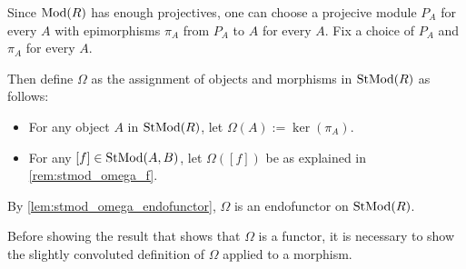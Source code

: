 \begin{definition}
    \label{def:stmod_omega}
    Since \( \operatorname{Mod}(R) \) has enough projectives, one can choose a projecive module \( P_A \) for every \( A \) with epimorphisms \( \pi_A \) from \( P_A \) to \( A \) for every \( A \). Fix a choice of \( P_A \) and \( \pi_A \) for every \( A \).

    Then define \( \Omega \) as the assignment of objects and morphisms in \( \operatorname{StMod}(R) \) as follows:
    \begin{itemize}
        \item For any object \( A \) in \( \operatorname{StMod}(R) \), let \( \Omega(A) := \ker(\pi_A) \).
        \item For any \( [f] \in \operatorname{StMod}(A, B) \), let \( \Omega([f]) \) be as explained in \autoref{rem:stmod_omega_f}.
    \end{itemize}

    By \autoref{lem:stmod_omega_endofunctor}, \( \Omega \) is an endofunctor on \( \operatorname{StMod}(R) \).
\end{definition}

Before showing the result that shows that \( \Omega \) is a functor, it is necessary to show the slightly convoluted definition of \( \Omega \) applied to a morphism.

